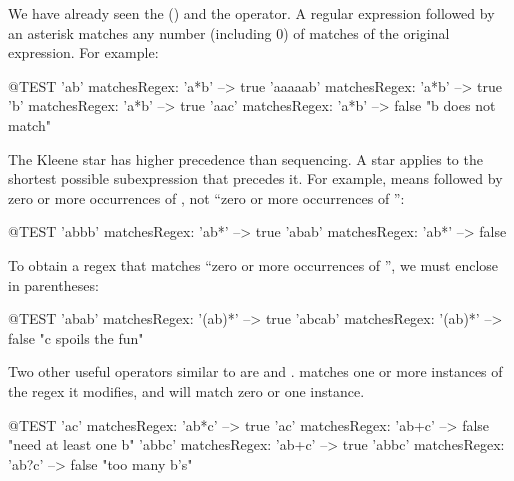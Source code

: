 \documentclass[a4paper,10pt,twoside]{book}
\begin{document}
We have already seen the  (\ct{*}) and the \ct{+} operator.
A regular expression followed by an asterisk matches any number (including 0) of matches of the original expression. For example:
\begin{code}{@TEST}
'ab' matchesRegex: 'a*b'         --> true
'aaaaab' matchesRegex: 'a*b' --> true
'b' matchesRegex: 'a*b'           --> true
'aac' matchesRegex: 'a*b'	    --> false    "b does not match"
\end{code}

The Kleene star has higher precedence than sequencing. A star applies to the
shortest possible subexpression that precedes it. For example, 
means  followed by zero or more occurrences of , not ``zero or more
occurrences of '':
\begin{code}{@TEST}
'abbb' matchesRegex: 'ab*' --> true
'abab' matchesRegex: 'ab*' --> false
\end{code}

To obtain a regex that matches ``zero or more occurrences of '', we must enclose  in parentheses:
\begin{code}{@TEST}
'abab' matchesRegex: '(ab)*'   --> true
'abcab' matchesRegex: '(ab)*' --> false    "c spoils the fun"
\end{code}

Two other useful operators similar to \ct{*} are \ct{+} and .
\ct{+} matches one or more instances of the regex it modifies, and  will match zero or one instance.
\begin{code}{@TEST}
'ac' matchesRegex: 'ab*c'	   --> true
'ac' matchesRegex: 'ab+c'	  --> false    "need at least one b"
'abbc' matchesRegex: 'ab+c' --> true
'abbc' matchesRegex: 'ab?c' --> false    "too many b's"
\end{code}
\end{document}
